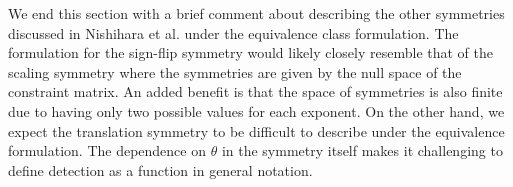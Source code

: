 We end this section with a brief comment about describing the other symmetries discussed in Nishihara et al. under the equivalence class formulation. The formulation for the sign-flip symmetry would likely closely resemble that of the scaling symmetry where the symmetries are given by the null space of the constraint matrix. An added benefit is that the space of symmetries is also finite due to having only two possible values for each exponent. On the other hand, we expect the translation symmetry to be difficult to describe under the equivalence formulation. The dependence on $\theta$ in the symmetry itself makes it challenging to define detection as a function in general notation.


